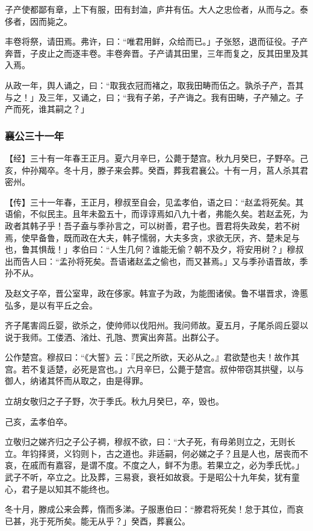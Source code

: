 \documentclass[]{article}
\begin{document}
子产使都鄙有章，上下有服，田有封洫，庐井有伍。大人之忠俭者，从而与之。泰侈者，因而毙之。

丰卷将祭，请田焉。弗许，曰：``唯君用鲜，众给而已。」子张怒，退而征役。子产奔晋，子皮止之而逐丰卷。丰卷奔晋。子产请其田里，三年而复之，反其田里及其入焉。

从政一年，舆人诵之，曰：``取我衣冠而褚之，取我田畴而伍之。孰杀子产，吾其与之！」及三年，又诵之，曰；``我有子弟，子产诲之。我有田畴，子产殖之。子产而死，谁其嗣之？」

\hypertarget{header-n2330}{%
\subsubsection{襄公三十一年}\label{header-n2330}}

【经】三十有一年春王正月。夏六月辛巳，公薨于楚宫。秋九月癸巳，子野卒。己亥，仲孙羯卒。冬十月，滕子来会葬。癸酉，葬我君襄公。十有一月，莒人杀其君密州。

【传】三十一年春，王正月，穆叔至自会，见孟孝伯，语之曰：``赵孟将死矣。其语偷，不似民主。且年未盈五十，而谆谆焉如八九十者，弗能久矣。若赵孟死，为政者其韩子乎！吾子盍与季孙言之，可以树善，君子也。晋君将失政矣，若不树焉，使早备鲁，既而政在大夫，韩子懦弱，大夫多贪，求欲无厌，齐、楚未足与也，鲁其惧哉！」孝伯曰：``人生几何？谁能无偷？朝不及夕，将安用树？」穆叔出而告人曰：``孟孙将死矣。吾语诸赵孟之偷也，而又甚焉。」又与季孙语晋故，季孙不从。

及赵文子卒，晋公室卑，政在侈家。韩宣子为政，为能图诸侯。鲁不堪晋求，谗慝弘多，是以有平丘之会。

齐子尾害闾丘婴，欲杀之，使帅师以伐阳州。我问师故。夏五月，子尾杀闾丘婴以说于我师。工偻洒、渻灶、孔虺、贾寅出奔莒。出群公子。

公作楚宫。穆叔曰：``《大誓》云：『民之所欲，天必从之。』君欲楚也夫！故作其宫。若不复适楚，必死是宫也。」六月辛巳，公薨于楚宫。叔仲带窃其拱璧，以与御人，纳诸其怀而从取之，由是得罪。

立胡女敬归之子子野，次于季氏。秋九月癸巳，卒，毁也。

己亥，孟孝伯卒。

立敬归之娣齐归之子公子裯，穆叔不欲，曰：``大子死，有母弟则立之，无则长立。年钧择贤，义钧则卜，古之道也。非适嗣，何必娣之子？且是人也，居丧而不哀，在戚而有嘉容，是谓不度。不度之人，鲜不为患。若果立之，必为季氏忧。」武子不听，卒立之。比及葬，三易衰，衰衽如故衰。于是昭公十九年矣，犹有童心，君子是以知其不能终也。

冬十月，滕成公来会葬，惰而多涕。子服惠伯曰：``滕君将死矣！怠于其位，而哀已甚，兆于死所矣。能无从乎？」癸酉，葬襄公。
\end{document}
